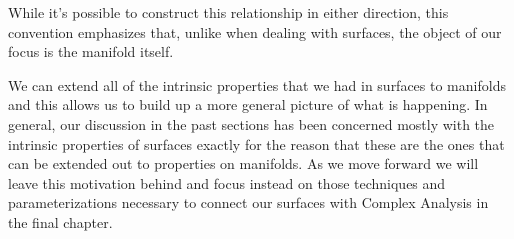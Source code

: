   While it's possible to construct this relationship in either direction, this convention emphasizes that, unlike when dealing with surfaces, the object of our focus is the manifold itself.

  We can extend all of the intrinsic properties that we had in surfaces to manifolds and this allows us to build up a more general picture of what is happening. In general, our discussion in the past sections has been concerned mostly with the intrinsic properties of surfaces exactly for the reason that these are the ones that can be extended out to properties on manifolds. As we move forward we will leave this motivation behind and focus instead on those techniques and parameterizations necessary to connect our surfaces with Complex Analysis in the final chapter.

